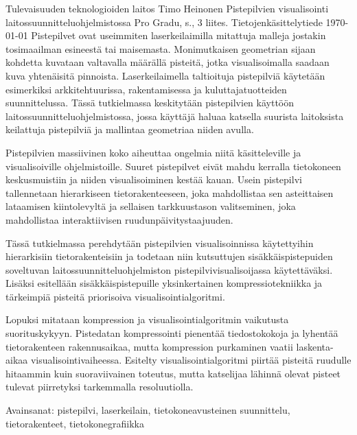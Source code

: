 \newpage
\begin{tiivistelma}%
        {Tulevaisuuden teknologioiden laitos}%
        {Timo Heinonen}%
        {Pistepilvien visualisointi laitossuunnitteluohjelmistossa}
        {Pro Gradu, \pageref{LastPage} s., 3 liites.}%
        {Tietojenkäsittelytiede}%
        {\today}%
  Pistepilvet ovat useimmiten laserkeilaimilla mitattuja malleja jostakin tosimaailman esineestä tai maisemasta. Monimutkaisen geometrian sijaan kohdetta kuvataan valtavalla määrällä pisteitä, jotka visualisoimalla saadaan kuva yhtenäisitä pinnoista. Laserkeilaimella taltioituja pistepilviä käytetään esimerkiksi arkkitehtuurissa, rakentamisessa ja kuluttajatuotteiden suunnittelussa. Tässä tutkielmassa keskitytään pistepilvien käyttöön laitossuunnitteluohjelmistossa, jossa käyttäjä haluaa katsella suurista laitoksista keilattuja pistepilviä ja mallintaa geometriaa niiden avulla.

  Pistepilvien massiivinen koko aiheuttaa ongelmia niitä käsitteleville ja visualisoiville ohjelmistoille. Suuret pistepilvet eivät mahdu kerralla tietokoneen keskusmuistiin ja niiden visualisoiminen kestää kauan. Usein pistepilvi tallennetaan hierarkiseen tietorakenteeseen, joka mahdollistaa sen asteittaisen lataamisen kiintolevyltä ja sellaisen tarkkuustason valitseminen, joka mahdollistaa interaktiivisen ruudunpäivitystaajuuden.
  
  Tässä tutkielmassa perehdytään pistepilvien visualisoinnissa käytettyihin hierarkisiin tietorakenteisiin ja todetaan niin kutsuttujen sisäkkäispistepuiden soveltuvan laitossuunnitteluohjelmiston pistepilvivisualisoijassa käytettäväksi. Lisäksi esitellään sisäkkäispistepuille yksinkertainen kompressiotekniikka ja tärkeimpiä pisteitä priorisoiva visualisointialgoritmi. 
  
  Lopuksi mitataan kompression ja visualisointialgoritmin vaikutusta suorituskykyyn. Pistedatan kompressointi pienentää tiedostokokoja ja lyhentää tietorakenteen rakennusaikaa, mutta kompression purkaminen vaatii laskenta-aikaa visualisointivaiheessa. Esitelty visualisointialgoritmi piirtää pisteitä ruudulle hitaammin kuin suoraviivainen toteutus, mutta katselijaa lähinnä olevat pisteet tulevat piirretyksi tarkemmalla resoluutiolla.

  Avainsanat: pistepilvi, laserkeilain, tietokoneavusteinen suunnittelu, tietorakenteet, tietokonegrafiikka

\end{tiivistelma}

\tableofcontents %
\newpage

